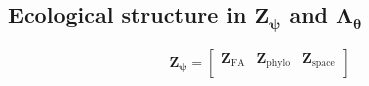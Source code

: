 \documentclass{article}
\newcommand{\dnorm}{\mathcal{N}}
\begin{document}
\subsection{Ecological structure in $\bm Z_{\bm\psi}$ and
  $\bm\Lambda_{\bm\theta}$}

\begin{equation}
  \label{eq:11}
  \bm Z_{\bm\psi} =
  \begin{bmatrix}
    \bm Z_{\mathrm{FA}} & \bm Z_{\mathrm{phylo}} & \bm
    Z_{\mathrm{space}} \\
  \end{bmatrix}
\end{equation}




\end{document}

